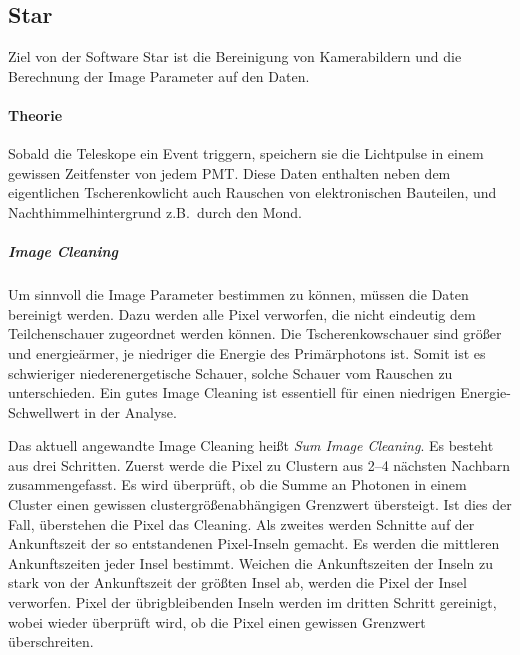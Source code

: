 \subsection{Star}%
\label{sub:star}
Ziel von der Software Star ist die Bereinigung von Kamerabildern und die Berechnung
der Image Parameter auf den Daten.

\paragraph{Theorie}
Sobald die Teleskope ein Event triggern,
speichern sie die Lichtpulse in einem gewissen Zeitfenster von jedem PMT.\@
Diese Daten enthalten neben dem eigentlichen Tscherenkowlicht auch
Rauschen von elektronischen Bauteilen,
und Nachthimmelhintergrund z.B.\ durch den Mond.

\subparagraph{Image Cleaning}
Um sinn\-voll die Im\-age Pa\-ra\-met\-er bestimmen zu können,
müssen die Daten bereinigt werden.
Dazu werden alle Pixel verworfen,
die nicht eindeutig dem Teilchenschauer zugeordnet werden können.
Die Tscherenkowschauer sind größer und energieärmer,
je niedriger die Energie des Primärphotons ist.
Somit ist es schwieriger niederenergetische Schauer,
solche Schauer vom Rauschen zu unterschieden.
Ein gutes Image Cleaning ist essentiell für einen niedrigen
Energie-Schwellwert in der Analyse.

Das aktuell angewandte Image Cleaning heißt \textit{Sum Image Cleaning}.
Es besteht aus drei Schritten.
Zuerst werde die Pixel zu Clustern aus 2--4 nächsten Nachbarn zusammengefasst.
Es wird überprüft, ob die Summe an Photonen in einem Cluster
einen gewissen clustergrößenabhängigen Grenzwert übersteigt.
Ist dies der Fall, überstehen die Pixel das Cleaning.
Als zweites werden Schnitte auf der Ankunftszeit der so entstandenen
Pixel-Inseln gemacht.
Es werden die mittleren Ankunftszeiten jeder Insel bestimmt.
Weichen die Ankunftszeiten der Inseln zu stark von der Ankunftszeit der größten Insel ab,
werden die Pixel der Insel verworfen.
Pixel der übrigbleibenden Inseln werden im dritten Schritt gereinigt,
wobei
wieder überprüft wird, ob die Pixel einen gewissen Grenzwert überschreiten.

